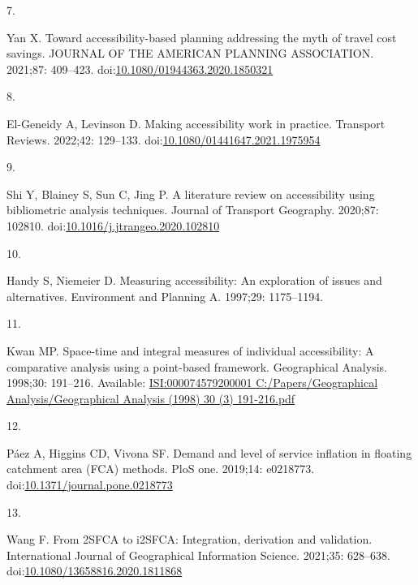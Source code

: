 \documentclass[10pt,letterpaper]{article}
\newlength{\cslhangindent}
\newlength{\csllabelwidth}
\newlength{\cslentryspacingunit} %
\newenvironment{CSLReferences}[2] %
 {%
  \setlength{\parindent}{0pt}
  \ifodd #1
  \let\oldpar\par
  \def\par{\hangindent=\cslhangindent\oldpar}
  \fi
  \setlength{\parskip}{#2\cslentryspacingunit}
 }%
 {}
\newcommand{\CSLLeftMargin}[1]{\parbox[t]{\csllabelwidth}{#1}}
\newcommand{\CSLRightInline}[1]{\parbox[t]{\linewidth - \csllabelwidth}{#1}\break}
\begin{document}
\begin{CSLReferences}{0}{0}
\leavevmode{}%
\CSLLeftMargin{7. }%
\CSLRightInline{Yan X. Toward accessibility-based planning addressing
the myth of travel cost savings. {JOURNAL} {OF} {THE} {AMERICAN}
{PLANNING} {ASSOCIATION}. 2021;87: 409--423.
doi:\href{https://doi.org/10.1080/01944363.2020.1850321}{10.1080/01944363.2020.1850321}}

\leavevmode{}%
\CSLLeftMargin{8. }%
\CSLRightInline{El-Geneidy A, Levinson D. Making accessibility work in
practice. Transport Reviews. 2022;42: 129--133.
doi:\href{https://doi.org/10.1080/01441647.2021.1975954}{10.1080/01441647.2021.1975954}}

\leavevmode{}%
\CSLLeftMargin{9. }%
\CSLRightInline{Shi Y, Blainey S, Sun C, Jing P. A literature review on
accessibility using bibliometric analysis techniques. Journal of
Transport Geography. 2020;87: 102810.
doi:\href{https://doi.org/10.1016/j.jtrangeo.2020.102810}{10.1016/j.jtrangeo.2020.102810}}

\leavevmode{}%
\CSLLeftMargin{10. }%
\CSLRightInline{Handy S, Niemeier D. Measuring accessibility: An
exploration of issues and alternatives. Environment and Planning A.
1997;29: 1175--1194. }

\leavevmode{}%
\CSLLeftMargin{11. }%
\CSLRightInline{Kwan MP. Space-time and integral measures of individual
accessibility: A comparative analysis using a point-based framework.
Geographical Analysis. 1998;30: 191--216. Available:
\href{https://ISI:000074579200001\%0AC:/Papers/Geographical\%20Analysis/Geographical\%20Analysis\%20(1998)\%2030\%20(3)\%20191-216.pdf}{ISI:000074579200001
C:/Papers/Geographical Analysis/Geographical Analysis (1998) 30 (3)
191-216.pdf}}

\leavevmode{}%
\CSLLeftMargin{12. }%
\CSLRightInline{Páez A, Higgins CD, Vivona SF. Demand and level of
service inflation in floating catchment area (FCA) methods. PloS one.
2019;14: e0218773.
doi:\href{https://doi.org/10.1371/journal.pone.0218773}{10.1371/journal.pone.0218773}}

\leavevmode{}%
\CSLLeftMargin{13. }%
\CSLRightInline{Wang F. From 2SFCA to i2SFCA: Integration, derivation
and validation. International Journal of Geographical Information
Science. 2021;35: 628--638.
doi:\href{https://doi.org/10.1080/13658816.2020.1811868}{10.1080/13658816.2020.1811868}}


\end{CSLReferences}
\end{document}
